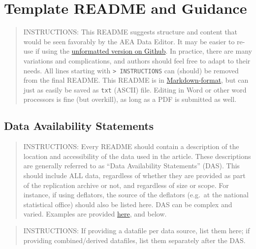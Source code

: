 \documentclass[
]{article}
\author{}
\date{}
\begin{document}
\hypertarget{template-readme-and-guidance}{%
\section{Template README and
Guidance}\label{template-readme-and-guidance}}

\begin{quote}
INSTRUCTIONS: This README suggests structure and content that would be
seen favorably by the AEA Data Editor. It may be easier to re-use if
using the
\href{https://github.com/AEADataEditor/aea-de-guidance/blob/master/template-README.md}{unformatted
version on Github}. In practice, there are many variations and
complications, and authors should feel free to adapt to their needs. All
lines starting with \texttt{\textgreater{}\ INSTRUCTIONS} can (should)
be removed from the final README. This README is in
\href{https://en.wikipedia.org/wiki/Markdown}{Markdown-format}, but can
just as easily be saved as \texttt{txt} (ASCII) file. Editing in Word or
other word processors is fine (but overkill), as long as a PDF is
submitted as well.
\end{quote}

\hypertarget{data-availability-statements}{%
\subsection{Data Availability
Statements}\label{data-availability-statements}}

\begin{quote}
INSTRUCTIONS: Every README should contain a description of the location
and accessibility of the data used in the article. These descriptions
are generally referred to as ``Data Availability Statements'' (DAS).
This should include ALL data, regardless of whether they are provided as
part of the replication archive or not, and regardless of size or scope.
For instance, if using deflators, the source of the deflators (e.g.~at
the national statistical office) should also be listed here. DAS can be
complex and varied. Examples are provided
\href{https://social-science-data-editors.github.io/guidance/Requested_information_dcas.html}{here},
and below.
\end{quote}

\begin{quote}
INSTRUCTIONS: If providing a datafile per data source, list them here;
if providing combined/derived datafiles, list them separately after the
DAS.
\end{quote}
\end{document}
